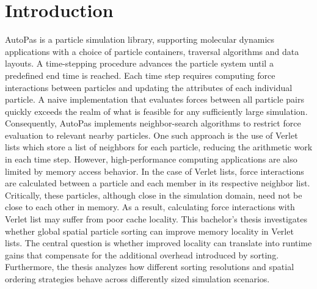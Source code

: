\chapter{Introduction}
\label{ch:introduction}
AutoPas is a particle simulation library, supporting molecular dynamics applications with a choice of particle containers, traversal algorithms and data layouts.
A time-stepping procedure advances the particle system until a predefined end time is reached.
Each time step requires computing force interactions between particles and updating the attributes of each individual particle.
\newline
\newline
A naive implementation that evaluates forces between all particle pairs quickly exceeds the realm of what is feasible for any sufficiently large simulation.
Consequently, AutoPas implements neighbor-search algorithms to restrict force evaluation to relevant nearby particles.
One such approach is the use of Verlet lists which store a list of neighbors for each particle, reducing the arithmetic work in each time step.
\newline
\newline
However, high-performance computing applications are also limited by memory access behavior.
In the case of Verlet lists, force interactions are calculated between a particle and each member in its respective neighbor list.
Critically, these particles, although close in the simulation domain, need not be close to each other in memory.
As a result, calculating force interactions with Verlet list may suffer from poor cache locality.
\newline
\newline
This bachelor's thesis investigates whether global spatial particle sorting can improve memory locality in Verlet lists.
The central question is whether improved locality can translate into runtime gains that compensate for the additional overhead introduced by sorting.
Furthermore, the thesis analyzes how different sorting resolutions and spatial ordering strategies behave across differently sized simulation scenarios.






